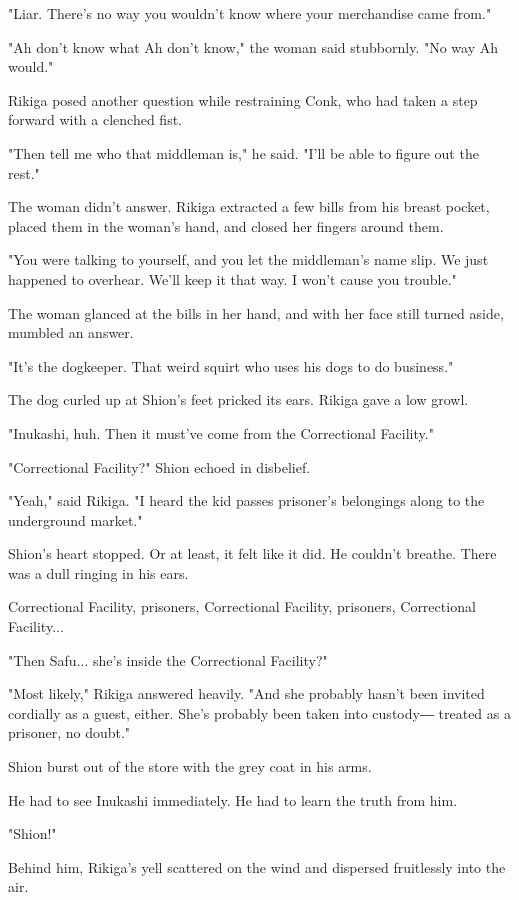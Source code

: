 "Liar. There's no way you wouldn't know where your merchandise came
from."

"Ah don't know what Ah don't know," the woman said stubbornly. "No way
Ah would."

Rikiga posed another question while restraining Conk, who had taken a
step forward with a clenched fist.

"Then tell me who that middleman is," he said. "I'll be able to figure
out the rest."

The woman didn't answer. Rikiga extracted a few bills from his breast
pocket, placed them in the woman's hand, and closed her fingers around
them.

"You were talking to yourself, and you let the middleman's name slip. We
just happened to overhear. We'll keep it that way. I won't cause you
trouble."

The woman glanced at the bills in her hand, and with her face still
turned aside, mumbled an answer.

"It's the dogkeeper. That weird squirt who uses his dogs to do
business."

The dog curled up at Shion's feet pricked its ears. Rikiga gave a low
growl.

"Inukashi, huh. Then it must've come from the Correctional Facility."

"Correctional Facility?" Shion echoed in disbelief.

"Yeah," said Rikiga. "I heard the kid passes prisoner's belongings along
to the underground market."

Shion's heart stopped. Or at least, it felt like it did. He couldn't
breathe. There was a dull ringing in his ears.

Correctional Facility, prisoners, Correctional Facility, prisoners,
Correctional Facility...

"Then Safu... she's inside the Correctional Facility?"

"Most likely," Rikiga answered heavily. "And she probably hasn't been
invited cordially as a guest, either. She's probably been taken into
custody― treated as a prisoner, no doubt."

Shion burst out of the store with the grey coat in his arms.

He had to see Inukashi immediately. He had to learn the truth from him.

"Shion!"

Behind him, Rikiga's yell scattered on the wind and dispersed
fruitlessly into the air.

